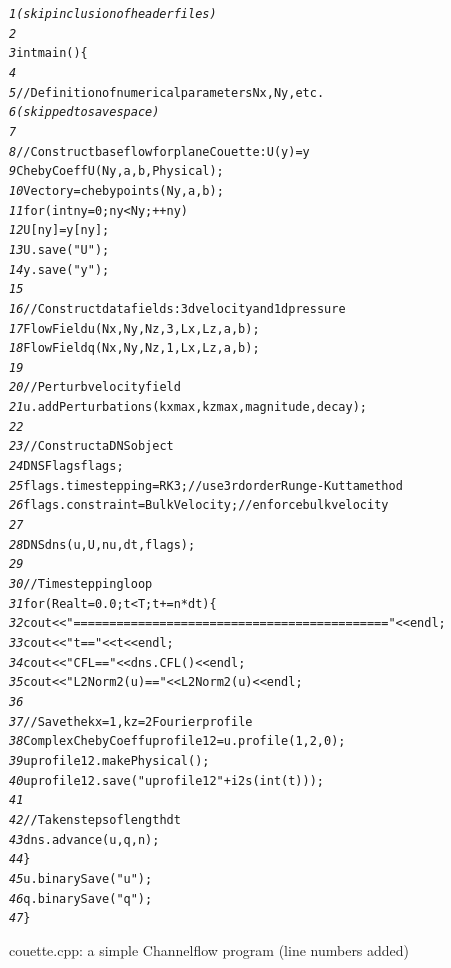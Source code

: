 \documentclass{article}[12pt]
\begin{document}
\begin{Code listing}
\small
\begin{alltt}
 {\it 1}  {\it (skip inclusion of header files)}
 {\it 2}
 {\it 3}  int main() \{
 {\it 4}
 {\it 5}    // Definition of numerical parameters Nx,Ny, etc.
 {\it 6}    {\it (skipped to save space)}
 {\it 7}
 {\it 8}    // Construct base flow for plane Couette: U(y) = y
 {\it 9}    ChebyCoeff U(Ny,a,b,Physical);
{\it 10}    Vector y = chebypoints(Ny, a,b);
{\it 11}    for (int ny=0; ny<Ny; ++ny)
{\it 12}      U[ny] = y[ny];
{\it 13}    U.save("U");
{\it 14}    y.save("y");
{\it 15}
{\it 16}    // Construct data fields: 3d velocity and 1d pressure
{\it 17}    FlowField u(Nx,Ny,Nz,3,Lx,Lz,a,b);
{\it 18}    FlowField q(Nx,Ny,Nz,1,Lx,Lz,a,b);
{\it 19}
{\it 20}    // Perturb velocity field
{\it 21}    u.addPerturbations(kxmax,kzmax,magnitude,decay);
{\it 22}
{\it 23}    // Construct a DNS object
{\it 24}    DNSFlags flags;
{\it 25}    flags.timestepping = RK3;  // use 3rd order Runge-Kutta method
{\it 26}    flags.constraint = BulkVelocity; // enforce bulk velocity
{\it 27}
{\it 28}    DNS dns(u, U, nu, dt, flags);
{\it 29}
{\it 30}    // Timestepping loop
{\it 31}    for (Real t=0.0; t<T; t += n*dt) \{
{\it 32}      cout << "============================================" << endl;
{\it 33}      cout << "         t == " << t << endl;
{\it 34}      cout << "       CFL == " << dns.CFL() << endl;
{\it 35}      cout << "L2Norm2(u) == " << L2Norm2(u) << endl;
{\it 36}
{\it 37}      // Save the kx=1,kz=2 Fourier profile
{\it 38}      ComplexChebyCoeff uprofile12 = u.profile(1,2,0);
{\it 39}      uprofile12.makePhysical();
{\it 40}      uprofile12.save("uprofile12"+i2s(int(t)));
{\it 41}
{\it 42}      // Take n steps of length dt
{\it 43}      dns.advance(u, q, n);
{\it 44}    \}
{\it 45}    u.binarySave("u");
{\it 46}    q.binarySave("q");
{\it 47}  \}
\end{alltt}
\normalsize
\caption{couette.cpp: a simple Channelflow program (line numbers added)}
\label{code:couette}
\end{Code listing}
\end{document}
